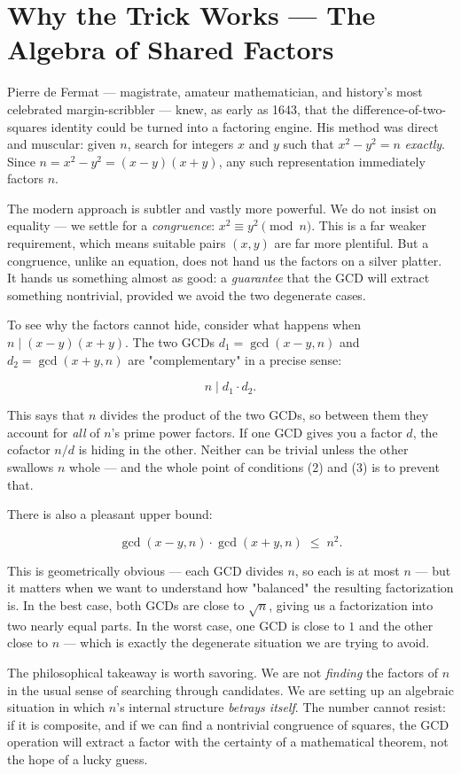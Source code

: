 \documentclass[11pt,twoside,openright]{book}
\theoremstyle{definition}
\theoremstyle{remark}
\begin{document}
\section{Why the Trick Works --- The Algebra of Shared Factors}

Pierre de Fermat --- magistrate, amateur mathematician, and history's most celebrated margin-scribbler --- knew, as early as 1643, that the difference-of-two-squares identity could be turned into a factoring engine. His method was direct and muscular: given $n$, search for integers $x$ and $y$ such that $x^2 - y^2 = n$ \textit{exactly}. Since $n = x^2 - y^2 = (x - y)(x + y)$, any such representation immediately factors $n$.

The modern approach is subtler and vastly more powerful. We do not insist on equality --- we settle for a \textit{congruence}: $x^2 \equiv y^2 \pmod{n}$. This is a far weaker requirement, which means suitable pairs $(x, y)$ are far more plentiful. But a congruence, unlike an equation, does not hand us the factors on a silver platter. It hands us something almost as good: a \textit{guarantee} that the GCD will extract something nontrivial, provided we avoid the two degenerate cases.

To see why the factors cannot hide, consider what happens when $n \mid (x - y)(x + y)$. The two GCDs $d_1 = \gcd(x - y, n)$ and $d_2 = \gcd(x + y, n)$ are "complementary" in a precise sense:

\[n \;\Big|\; d_1 \cdot d_2.\]

This says that $n$ divides the product of the two GCDs, so between them they account for \textit{all} of $n$'s prime power factors. If one GCD gives you a factor $d$, the cofactor $n / d$ is hiding in the other. Neither can be trivial unless the other swallows $n$ whole --- and the whole point of conditions (2) and (3) is to prevent that.

There is also a pleasant upper bound:

\[\gcd(x - y, n) \cdot \gcd(x + y, n) \;\leq\; n^2.\]

This is geometrically obvious --- each GCD divides $n$, so each is at most $n$ --- but it matters when we want to understand how "balanced" the resulting factorization is. In the best case, both GCDs are close to $\sqrt{n}$, giving us a factorization into two nearly equal parts. In the worst case, one GCD is close to $1$ and the other close to $n$ --- which is exactly the degenerate situation we are trying to avoid.


The philosophical takeaway is worth savoring. We are not \textit{finding} the factors of $n$ in the usual sense of searching through candidates. We are setting up an algebraic situation in which $n$'s internal structure \textit{betrays itself}. The number cannot resist: if it is composite, and if we can find a nontrivial congruence of squares, the GCD operation will extract a factor with the certainty of a mathematical theorem, not the hope of a lucky guess.
\end{document}
